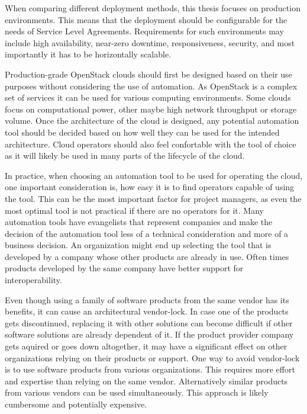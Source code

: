 \documentclass[officiallayout]{tktla}
\begin{document}
When comparing different deployment methods, this thesis focuses on production
environments. This means that the deployment should be configurable for the
needs of Service Level Agreements. Requirements for such environments may
include high availability, near-zero downtime, responsiveness, security, and
most importantly it has to be horizontally scalable.

Production-grade OpenStack clouds should first be designed based on their use
purposes without considering the use of automation. As OpenStack is a complex
set of services it can be used for various computing environments. Some clouds
focus on computational power, other maybe high network throughput or storage
volume. Once the architecture of the cloud is designed, any potential
automation tool should be decided based on how well they can be used for the
intended architecture. Cloud operators should also feel confortable with the
tool of choice as it will likely be used in many parts of the lifecycle of the
cloud.

In practice, when choosing an automation tool to be used for operating the
cloud, one important consideration is, how easy it is to find operators capable
of using the tool. This can be the most important factor for project managers,
as even the most optimal tool is not practical if there are no operators for
it. Many automation tools have evangelists that represent companies and make
the decision of the automation tool less of a technical consideration and more
of a business decision. An organization might end up selecting the tool that is
developed by a company whose other products are already in use. Often times
products developed by the same company have better support for
interoperability.

Even though using a family of software products from the same vendor has its
benefits, it can cause an architectural vendor-lock. In case one of the
products gets discontinued, replacing it with other solutions can become
difficult if other software solutions are already dependent of it. If the
product provider company gets aquired or goes down altogether, it may have a
significant effect on other organizations relying on their products or support.
One way to avoid vendor-lock is to use software products from various
organizations. This requires more effort and expertise than relying on the same
vendor. Alternatively similar products from various vendors can be used
simultaneously. This approach is likely cumbersome and potentially expensive.
\end{document}
